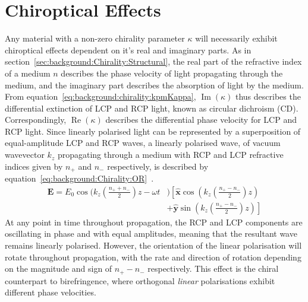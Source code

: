 \section{Chiroptical Effects}\label{sec:background:Chirality:Chiroptics}
Any material with a non-zero chirality parameter $\kappa$ will necessarily exhibit chiroptical effects dependent on it's real and imaginary parts. As in section~\ref{sec:background:Chirality:Structural}, the real part of the refractive index of a medium $n$ describes the phase velocity of light propagating through the medium, and the imaginary part describes the absorption of light by the medium. From equation~\ref{eq:background:chirality:kpmKappa}, $\operatorname{Im}(\kappa)$ thus describes the differential extinction of LCP and RCP light, known as circular dichroism (CD). Correspondingly, $\operatorname{Re}(\kappa)$ describes the differential phase velocity for LCP and RCP light. Since linearly polarised light can be represented by a superposition of equal-amplitude LCP and RCP waves, a linearly polarised wave, of vacuum wavevector $k_z$ propagating through a medium with RCP and LCP refractive indices given by $n_+$ and $n_-$ respectively, is described by equation~\ref{eq:background:Chirality:OR}~\cite[\S 8.10]{Hecht2013}.
\begin{equation}\label{eq:background:Chirality:OR}
    \begin{split}
        \mathbf{E} = E_0 \cos(k_z (\frac{n_+ + n_-}{2})z -\omega t &) \left[ \mathbf{\hat{x}} \cos(k_z (\frac{n_+ - n_-}{2})z ) \right. \\
        & \left. + \mathbf{\hat{y}} \sin(k_z (\frac{n_+ - n_-}{2}) z)\right]
    \end{split}
\end{equation}
At any point in time throughout propagation, the RCP and LCP components are oscillating in phase and with equal amplitudes, meaning that the resultant wave remains linearly polarised. However, the orientation of the linear polarisation will rotate throughout propagation, with the rate and direction of rotation depending on the magnitude and sign of $n_+ - n_-$ respectively. This effect is the chiral counterpart to birefringence, where orthogonal \textit{linear} polarisations exhibit different phase velocities. 

